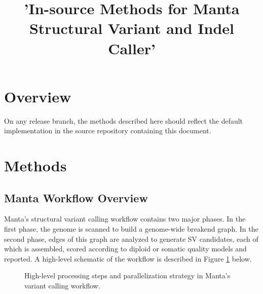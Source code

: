 \documentclass{article}
\title{'In-source Methods for Manta Structural Variant and Indel Caller'}
\begin{document}
\maketitle

\tableofcontents

\section{Overview}

On any release branch, the methods described here should reflect the default implementation in the source repository containing this document. 

\section{Methods}

\subsection{Manta Workflow Overview}

Manta's structural variant calling workflow contains two major phases. In the first phase, the genome is scanned to build a genome-wide breakend graph. In the second phase, edges of this graph are analyzed to generate SV candidates, each of which is assembled, scored according to diploid or somatic quality models and reported. A high-level schematic of the workflow is described in Figure \ref{fig:workflow} below.

\begin{figure}[h]
\centerline{
}
\caption{High-level processing steps and parallelization strategy in Manta's variant calling workflow.}
\label{fig:workflow}
\end{figure}
\end{document}
